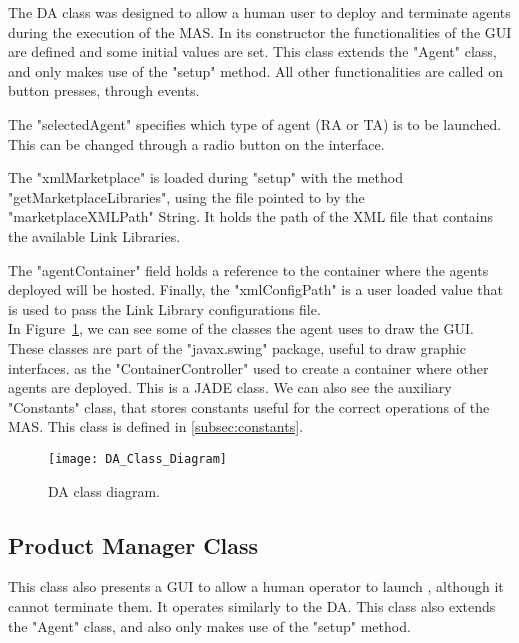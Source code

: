 The \acrlong{DA} class was designed to allow a human user to deploy and terminate agents during the execution of the \acrshort{MAS}. In its constructor the functionalities of the \acrshort{GUI} are defined and some initial values are set. This class extends the "Agent" class, and only makes use of the "setup" method. All other functionalities are called on button presses, through events.

The "selectedAgent" specifies which type of agent (\acrshort{RA} or \acrshort{TA}) is to be launched. This can be changed through a radio button on the interface.

The "xmlMarketplace" is loaded during "setup" with the method "getMarketplaceLibraries", using the file pointed to by the "marketplaceXMLPath" String. It holds the path of the \acrshort{XML} file that contains the available Link Libraries.

The "agentContainer" field holds a reference to the container where the agents deployed will be hosted. Finally, the "xmlConfigPath" is a user loaded value that is used to pass the Link Library configurations file.\\

In Figure~\ref{fig:da_class_diagram}, we can see some of the classes the agent uses to draw the \acrshort{GUI}. These classes are part of the "javax.swing" package, useful to draw graphic interfaces. as the "ContainerController" used to create a container where other agents are deployed. This is a \acrshort{JADE} class. We can also see the auxiliary "Constants" class, that stores constants useful for the correct operations of the \acrshort{MAS}. This class is defined in \ref{subsec:constants}.\\

\begin{figure}[h!]
	\centering
	\texttt{[image: DA\_Class\_Diagram]}
	\caption{\acrlong{DA} class diagram.}
	\label{fig:da_class_diagram}
\end{figure}

\subsection{Product Manager Class}
\label{subsec:product_manager_agent}

This class also presents a \acrshort{GUI} to allow a human operator to launch , although it cannot terminate them. It operates similarly to the \acrshort{DA}. This class also extends the "Agent" class, and also only makes use of the "setup" method.\\


